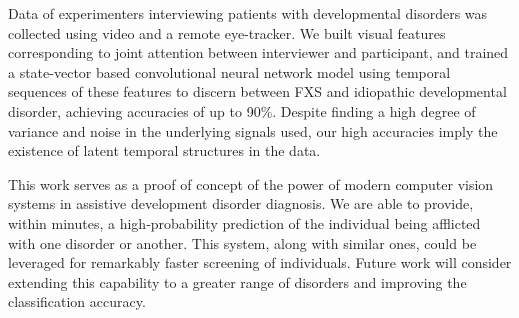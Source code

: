 \documentclass[10pt,twocolumn,letterpaper]{article}
\begin{document}
Data of experimenters interviewing patients with developmental disorders was collected using video and a remote eye-tracker. We built visual features corresponding to joint attention between interviewer and participant, and trained a state-vector based convolutional neural network model using temporal sequences of these features to discern between FXS and idiopathic developmental disorder, achieving accuracies of up to 90\%. Despite finding a high degree of variance and noise in the underlying signals used, our high accuracies imply the existence of latent temporal structures in the data. 


This work serves as a proof of concept of the power of modern computer vision systems in assistive development disorder diagnosis. We are able to provide, within minutes, a high-probability prediction of the individual being afflicted with one disorder or another. This system, along with similar ones, could be leveraged for remarkably faster screening of individuals. Future work will consider extending this capability to a greater range of disorders and improving the classification accuracy.

\newpage

{\footnotesize


}

\end{document}
